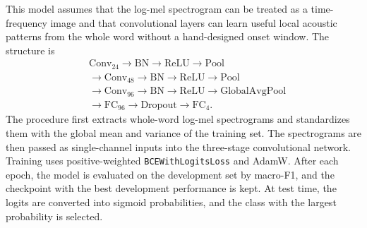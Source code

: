 This model assumes that the log-mel spectrogram can be treated as a time-frequency image and that convolutional layers can learn useful local acoustic patterns from the whole word without a hand-designed onset window. The structure is
\[
\begin{aligned}
&\mathrm{Conv}_{24}\rightarrow\mathrm{BN}\rightarrow\mathrm{ReLU}\rightarrow\mathrm{Pool}\\
&\rightarrow\mathrm{Conv}_{48}\rightarrow\mathrm{BN}\rightarrow\mathrm{ReLU}\rightarrow\mathrm{Pool}\\
&\rightarrow\mathrm{Conv}_{96}\rightarrow\mathrm{BN}\rightarrow\mathrm{ReLU}\rightarrow\mathrm{GlobalAvgPool}\\
&\rightarrow\mathrm{FC}_{96}\rightarrow\mathrm{Dropout}\rightarrow\mathrm{FC}_{4}.
\end{aligned}
\]
The procedure first extracts whole-word log-mel spectrograms and standardizes them with the global mean and variance of the training set. The spectrograms are then passed as single-channel inputs into the three-stage convolutional network. Training uses positive-weighted \texttt{BCEWithLogitsLoss} and AdamW. After each epoch, the model is evaluated on the development set by macro-F1, and the checkpoint with the best development performance is kept. At test time, the logits are converted into sigmoid probabilities, and the class with the largest probability is selected.

